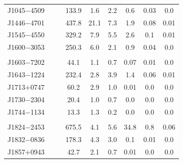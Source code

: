 \documentclass[useAMS,usenatbib]{mn2e}
\begin{document}
\begin{table}
\begin{center}
\begin{tabular}{lcccccccc}
J1045$-$4509&         &                   & 133.9    & 1.6       & 2.2         &  0.6     &  0.03             &  0.0      \\ 
J1446$-$4701&         &                   & 437.8    & 21.1      & 7.3         &  1.9     &  0.08             &  0.01     \\ 
J1545$-$4550&         &                   & 329.2    & 7.9       & 5.5         &  2.6     &  0.1              &  0.01      \\ 
J1600$-$3053&         &                   & 250.3    & 6.0       & 2.1         &  0.9     &  0.04             &  0.0      \\ 
            &         &                   &          &           &             &          &                   &           \\
J1603$-$7202&         &                   & 44.1     & 1.1       & 0.7         &  0.07    &  0.01             &  0.0      \\ 
J1643$-$1224&         &                   & 232.4    & 2.8       & 3.9         &  1.4     &  0.06             &  0.01      \\ 
J1713$+$0747&         &                   & 60.2     & 2.9       & 1.0         &  0.01    &  0.0              &  0.0      \\ 
J1730$-$2304&         &                   & 20.4     & 1.0       & 0.7         &  0.0     &  0.0              &  0.0      \\ 
%
%
J1744$-$1134&         &                   & 13.3     & 1.3       & 0.2         &  0.0     &  0.0              &  0.0      \\ 
            &         &                   &          &           &             &          &                   &           \\
J1824$-$2453&         &                   & 675.5    & 4.1       & 5.6         &  34.8    &  0.8              &  0.06     \\ 
J1832$-$0836&         &                   & 178.3    & 4.3       & 3.0         &  0.1     &  0.01             &  0.0      \\ 
J1857$+$0943&         &                   & 42.7     & 2.1       & 0.7         &  0.01    &  0.0              &  0.0      \\ 

\end{tabular}
\end{center}
\end{table}
\end{document}
